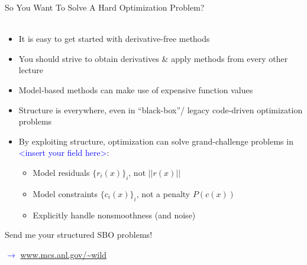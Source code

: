 \documentclass[handout,aspectratio=54]{beamer}
\numberwithin{theorem}{section}
\begin{document}
\begin{frame}{So You Want To Solve A Hard Optimization Problem?}
\colorbox[rgb]{0.5,0.6,0.7}{\textcolor{white}{Mathematically unwrap problems to expose the deepest black boxes!}}

\begin{itemize}
\item  It is easy to get started with derivative-free methods
\item  You should strive to obtain derivatives \& apply methods from every other lecture
\end{itemize}

\begin{itemize}
\item  Model-based methods can make use of expensive function values
\item  Structure is everywhere, even in “black-box”/ legacy code-driven optimization problems
\item By exploiting structure, optimization can solve grand-challenge problems in \textcolor{blue}{<insert your field here>}:
	\begin{itemize}
	\item  Model residuals $\{r_i(x)\}_i$, not $||r(x)||$
	\item  Model constraints $\{c_i(x)\}_i$, not a penalty $P(c(x))$
	\item  Explicitly handle nonsmoothness (and noise)
	\end{itemize}
\end{itemize}

Send me your structured SBO problems!

\flushright
\textcolor{blue}{$\rightarrow$ \url{www.mcs.anl.gov/~wild}}
\end{frame}
\end{document}
